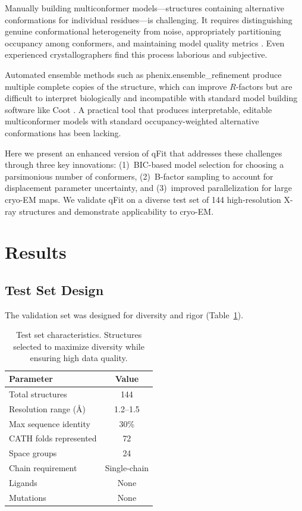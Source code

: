 \documentclass[11pt]{article}
\begin{document}
Manually building multiconformer models---structures containing alternative conformations for individual residues---is challenging. It requires distinguishing genuine conformational heterogeneity from noise, appropriately partitioning occupancy among conformers, and maintaining model quality metrics \citep{emsley2010features}. Even experienced crystallographers find this process laborious and subjective.

Automated ensemble methods such as phenix.ensemble\_refinement \citep{burnley2012modelling} produce multiple complete copies of the structure, which can improve $R$-factors but are difficult to interpret biologically and incompatible with standard model building software like Coot \citep{emsley2010features}. A practical tool that produces interpretable, editable multiconformer models with standard occupancy-weighted alternative conformations has been lacking.

Here we present an enhanced version of qFit \citep{qfit_original2015} that addresses these challenges through three key innovations: (1)~BIC-based model selection \citep{bic_schwarz1978} for choosing a parsimonious number of conformers, (2)~B-factor sampling to account for displacement parameter uncertainty, and (3)~improved parallelization for large cryo-EM maps. We validate qFit on a diverse test set of 144 high-resolution X-ray structures and demonstrate applicability to cryo-EM.

\section{Results}

\subsection{Test Set Design}

The validation set was designed for diversity and rigor (Table~\ref{tab:testset}).

\begin{table}[H]
\centering
\caption{Test set characteristics. Structures selected to maximize diversity while ensuring high data quality.}
\label{tab:testset}
\begin{tabular}{lc}
\toprule
Parameter & Value \\
\midrule
Total structures & 144 \\
Resolution range (\AA) & 1.2--1.5 \\
Max sequence identity & 30\% \\
CATH folds represented & 72 \\
Space groups & 24 \\
Chain requirement & Single-chain \\
Ligands & None \\
Mutations & None \\
\bottomrule
\end{tabular}
\end{table}
\end{document}
